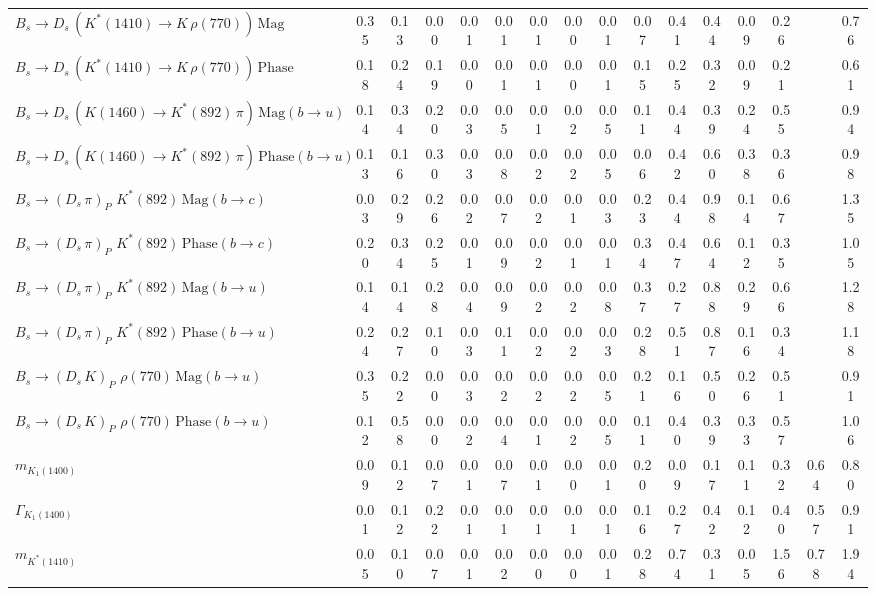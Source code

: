 \begin{tabular}{l  c  c  c  c  c  c  c  c  c  c  c  c  c  c  | c }
$B_s \to D_s \, ( K^{*}(1410) \to K \, \rho(770) ) \, \text{Mag}$ & 0.35 & 0.13 & 0.00 & 0.01 & 0.01 & 0.01 & 0.00 & 0.01 & 0.07 & 0.41 & 0.44 & 0.09 & 0.26 &  & 0.76 \\ 
$B_s \to D_s \, ( K^{*}(1410) \to K \, \rho(770) ) \, \text{Phase}$ & 0.18 & 0.24 & 0.19 & 0.00 & 0.01 & 0.01 & 0.00 & 0.01 & 0.15 & 0.25 & 0.32 & 0.09 & 0.21 &  & 0.61 \\ 
$B_s \to D_s \, ( K(1460) \to K^{*}(892) \, \pi ) \, \text{Mag} (b \to u)$ & 0.14 & 0.34 & 0.20 & 0.03 & 0.05 & 0.01 & 0.02 & 0.05 & 0.11 & 0.44 & 0.39 & 0.24 & 0.55 &  & 0.94 \\ 
$B_s \to D_s \, ( K(1460) \to K^{*}(892) \, \pi ) \, \text{Phase} (b \to u)$ & 0.13 & 0.16 & 0.30 & 0.03 & 0.08 & 0.02 & 0.02 & 0.05 & 0.06 & 0.42 & 0.60 & 0.38 & 0.36 &  & 0.98 \\ 
$B_s \to ( D_s \, \pi)_{P} \, \, K^{*}(892) \, \text{Mag} (b \to c)$ & 0.03 & 0.29 & 0.26 & 0.02 & 0.07 & 0.02 & 0.01 & 0.03 & 0.23 & 0.44 & 0.98 & 0.14 & 0.67 &  & 1.35 \\ 
$B_s \to ( D_s \, \pi)_{P} \, \, K^{*}(892) \, \text{Phase} (b \to c)$ & 0.20 & 0.34 & 0.25 & 0.01 & 0.09 & 0.02 & 0.01 & 0.01 & 0.34 & 0.47 & 0.64 & 0.12 & 0.35 &  & 1.05 \\ 
$B_s \to ( D_s \, \pi)_{P} \, \, K^{*}(892) \, \text{Mag} (b \to u)$ & 0.14 & 0.14 & 0.28 & 0.04 & 0.09 & 0.02 & 0.02 & 0.08 & 0.37 & 0.27 & 0.88 & 0.29 & 0.66 &  & 1.28 \\ 
$B_s \to ( D_s \, \pi)_{P} \, \, K^{*}(892) \, \text{Phase} (b \to u)$ & 0.24 & 0.27 & 0.10 & 0.03 & 0.11 & 0.02 & 0.02 & 0.03 & 0.28 & 0.51 & 0.87 & 0.16 & 0.34 &  & 1.18 \\ 
$B_s \to ( D_s \, K)_{P} \, \, \rho(770) \, \text{Mag} (b \to u)$ & 0.35 & 0.22 & 0.00 & 0.03 & 0.02 & 0.02 & 0.02 & 0.05 & 0.21 & 0.16 & 0.50 & 0.26 & 0.51 &  & 0.91 \\ 
$B_s \to ( D_s \, K)_{P} \, \, \rho(770) \, \text{Phase} (b \to u)$ & 0.12 & 0.58 & 0.00 & 0.02 & 0.04 & 0.01 & 0.02 & 0.05 & 0.11 & 0.40 & 0.39 & 0.33 & 0.57 &  & 1.06 \\ 
$m_{K_1(1400)} $ & 0.09 & 0.12 & 0.07 & 0.01 & 0.07 & 0.01 & 0.00 & 0.01 & 0.20 & 0.09 & 0.17 & 0.11 & 0.32 & 0.64 & 0.80 \\ 
$\Gamma_{K_1(1400)}$ & 0.01 & 0.12 & 0.22 & 0.01 & 0.01 & 0.01 & 0.01 & 0.01 & 0.16 & 0.27 & 0.42 & 0.12 & 0.40 & 0.57 & 0.91 \\ 
$m_{K^{*}(1410)}$ & 0.05 & 0.10 & 0.07 & 0.01 & 0.02 & 0.00 & 0.00 & 0.01 & 0.28 & 0.74 & 0.31 & 0.05 & 1.56 & 0.78 & 1.94 \\ 

\end{tabular}
